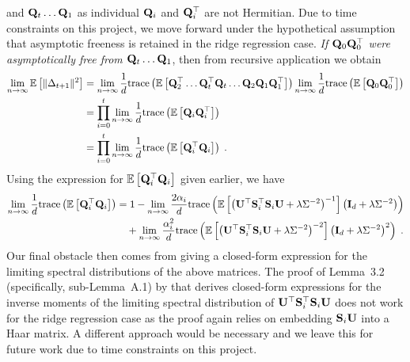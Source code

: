 and $\mathbf{Q}_t\ldots\mathbf{Q}_1$ as individual $\mathbf{Q}_i$ and $\mathbf{Q}_i^\top$ are not Hermitian. Due to time constraints on this project, we move forward under the hypothetical assumption that asymptotic freeness is retained in the ridge regression case. \textit{If $\mathbf{Q}_0\mathbf{Q}_0^\top$ were asymptotically free from $\mathbf{Q}_t\ldots\mathbf{Q}_1$}, then from recursive application we obtain
\begin{align*}
\lim_{n\rightarrow\infty}\mathbb{E}\left[\|\Delta_{t+1}\|^2\right] &= \lim_{n\rightarrow\infty}\frac{1}{d}\mathrm{trace}\left(\mathbb{E}\left[\mathbf{Q}_2^\top\ldots \mathbf{Q}_t^\top\mathbf{Q}_t\ldots\mathbf{Q}_2\mathbf{Q}_1\mathbf{Q}_1^\top\right]\right)\lim_{n\rightarrow\infty}\frac{1}{d}\mathrm{trace}\left(\mathbb{E}\left[\mathbf{Q}_0\mathbf{Q}_0^\top\right]\right) \\
&= \prod_{i=0}^t\lim_{n\rightarrow\infty}\frac{1}{d}\mathrm{trace}\left(\mathbb{E}\left[\mathbf{Q}_i\mathbf{Q}_i^\top\right]\right) \\
&= \prod_{i=0}^t\lim_{n\rightarrow\infty}\frac{1}{d}\mathrm{trace}\left(\mathbb{E}\left[\mathbf{Q}_i^\top\mathbf{Q}_i\right]\right) \;.
\end{align*}
Using the expression for $\mathbb{E}\left[\mathbf{Q}_i^\top\mathbf{Q}_i\right]$ given earlier, we have
\begin{align*}
\lim_{n\rightarrow\infty}\frac{1}{d}\mathrm{trace}\left(\mathbb{E}\left[\mathbf{Q}_i^\top\mathbf{Q}_i\right]\right) &= 1 - \lim_{n\rightarrow\infty}\frac{2\alpha_i}{d}\mathrm{trace}\left(\mathbb{E}\left[\left(\mathbf{U}^\top\mathbf{S}_i^\top\mathbf{S}_i\mathbf{U} + \lambda\Sigma^{-2}\right)^{-1}\right]\left(\mathbf{I}_d + \lambda\Sigma^{-2}\right)\right) \\
&\quad + \lim_{n\rightarrow\infty}\frac{\alpha_i^2}{d}\mathrm{trace}\left(\mathbb{E}\left[\left(\mathbf{U}^\top\mathbf{S}_i^\top\mathbf{S}_i\mathbf{U} + \lambda\Sigma^{-2}\right)^{-2}\right]\left(\mathbf{I}_d + \lambda\Sigma^{-2}\right)^2\right) \;.
\end{align*}
Our final obstacle then comes from giving a closed-form expression for the limiting spectral distributions of the above matrices. The proof of Lemma~3.2 (specifically, sub-Lemma~A.1) by \citet{Lacotte:2020} that derives closed-form expressions for the inverse moments of the limiting spectral distribution of $\mathbf{U}^\top\mathbf{S}_i^\top\mathbf{S}_i\mathbf{U}$ does not work for the ridge regression case as the proof again relies on embedding $\mathbf{S}_i\mathbf{U}$ into a Haar matrix. A different approach would be necessary and we leave this for future work due to time constraints on this project.
\\


